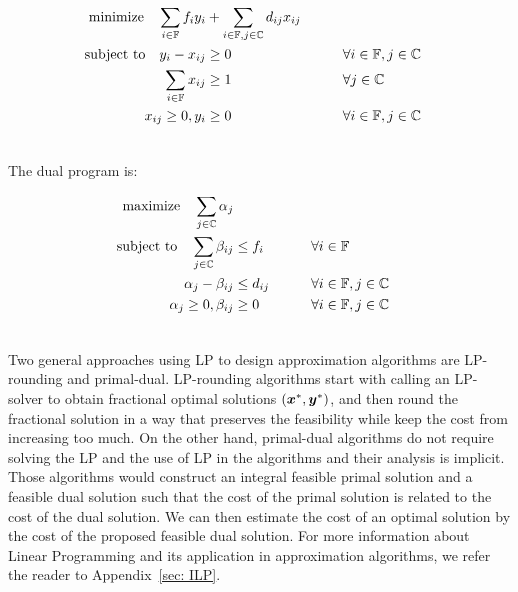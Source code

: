 \documentclass[oneside,final]{ucr}
\begin{document}
\begin{alignat}{3}
  \textrm{minimize} \quad \sum_{i\in \mathbb{F}}f_iy_i &+
  \sum_{i\in \mathbb{F}, j\in \mathbb{C}} d_{ij}x_{ij}
  &\label{eqn:ufl_primal}
\\ \notag
\textrm{subject to} \quad y_i - x_{ij} &\geq 0 &\quad\quad & \forall i\in \mathbb{F}, j\in \mathbb{C} 
\\ \notag
\sum_{i\in \mathbb{F}} x_{ij} &\geq 1 & &\forall j\in \mathbb{C}
\\ \notag
x_{ij} \geq 0, y_i &\geq 0 & &\forall i\in \mathbb{F}, j\in \mathbb{C} 
\\ \notag
\end{alignat}


\noindent
The dual program is:

\begin{alignat}{3}
  \textrm{maximize}\quad \sum_{j\in \mathbb{C}} \alpha_j&\label{eqn:ufl_dual}  
  \\ \notag
  \textrm{subject to} \quad 
  \sum_{j\in \mathbb{C}}\beta_{ij} &\leq f_i  &\quad\quad &\forall i \in \mathbb{F}  
  \\ \notag
  \alpha_{j} - \beta_{ij} &\leq  d_{ij} &  & \forall i\in \mathbb{F}, j\in \mathbb{C} 
  \\ \notag
  \alpha_j \geq 0, \beta_{ij} &\geq 0 &  & \forall i\in \mathbb{F}, j\in \mathbb{C}
  \\ \notag
\end{alignat}

Two general approaches using LP to design approximation
algorithms are LP-rounding and primal-dual. LP-rounding
algorithms start with calling an LP-solver to obtain
fractional optimal solutions $(\boldsymbol{x}^\ast,\boldsymbol{y}^\ast)$, and
then round the fractional solution in a way that preserves
the feasibility while keep the cost from increasing too
much. On the other hand, primal-dual algorithms do not
require solving the LP and the use of LP in the algorithms
and their analysis is implicit. Those algorithms would
construct an integral feasible primal solution and a
feasible dual solution such that the cost of the primal
solution is related to the cost of the dual solution. We can
then estimate the cost of an optimal solution by the cost of
the proposed feasible dual solution. For more information
about Linear Programming and its application in
approximation algorithms, we refer the reader to
Appendix~\ref{sec: ILP}.
\end{document}
